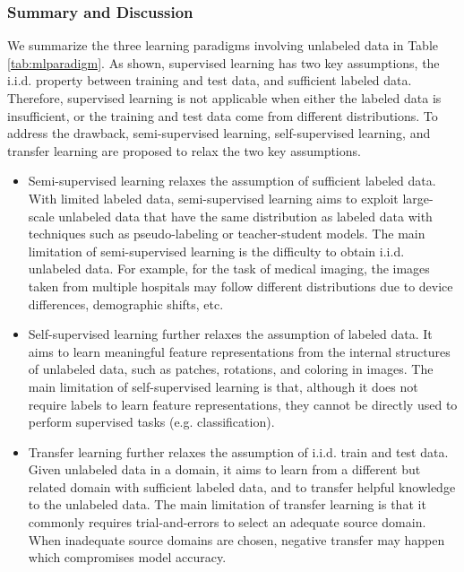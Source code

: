 \documentclass[11pt]{article}
\begin{document}
\subsubsection{Summary and Discussion}
We summarize the three learning paradigms involving unlabeled data in Table \ref{tab:mlparadigm}. As shown, supervised learning has two key assumptions, the i.i.d. property between training and test data, and sufficient labeled data. Therefore, supervised learning is not applicable when either the labeled data is insufficient, or the training and test data come from different distributions. To address the drawback, semi-supervised learning, self-supervised learning, and transfer learning are proposed to relax the two key assumptions.
\begin{itemize}
    \item Semi-supervised learning relaxes the assumption of sufficient labeled data. With limited labeled data, semi-supervised learning aims to exploit large-scale unlabeled data that have the same distribution as labeled data with techniques such as pseudo-labeling or teacher-student models. The main limitation of semi-supervised learning is the difficulty to obtain i.i.d. unlabeled data. For example, for the task of medical imaging, the images taken from multiple hospitals may follow different distributions due to device differences, demographic shifts, etc.
    \item Self-supervised learning further relaxes the assumption of labeled data. It aims to learn meaningful feature representations from the internal structures of unlabeled data, such as patches, rotations, and coloring in images. The main limitation of self-supervised learning is that, although it does not require labels to learn feature representations, they cannot be directly used to perform supervised tasks (e.g. classification).
    \item Transfer learning further relaxes the assumption of i.i.d. train and test data. Given unlabeled data in a domain, it aims to learn from a different but related domain with sufficient labeled data, and to transfer helpful knowledge to the unlabeled data. The main limitation of transfer learning is that it commonly requires trial-and-errors to select an adequate source domain. When inadequate source domains are chosen, negative transfer \cite{Yilun-rosenstein2005transfer} may happen which compromises model accuracy.
\end{itemize}
\end{document}
